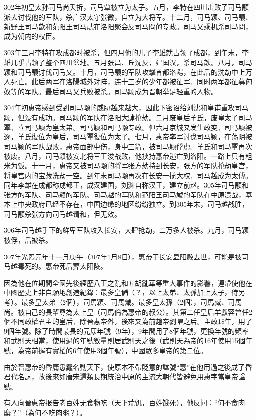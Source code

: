 302年初皇太孙司马尚夭折，司马覃被立为太子。五月，李特在四川击败了司马颙派去讨伐他的军队，杀广汉太守张微，自立为大将军。十二月，司马颖、司马颙、新野王司马歆和范阳王司马虓在洛阳聚会反司马冏的专政。司马乂乘机杀司马冏，成为朝内的权臣。

303年三月李特在攻成都时被杀，但四月他的儿子李雄就占领了成都，到年末，李雄几乎占领了整个四川盆地。五月张昌、丘沈反，建国汉，杀司马歆。八月，司马颖和司马颙讨伐司马乂。十月，司马颙的军队攻擊首都洛陽，在此后的洗劫中上万人死亡。此后两军在洛陽城外对阵，连十三岁的少年都被征军，同时两军都征募匈奴等的军队。最后司马乂兵败被杀。司马颙成为晋朝举足轻重的人物。

304年初惠帝感到受到司马颙的威胁越来越大，因此下密诏给刘沈和皇甫重攻司马颙，但没有成功。司马颙的军队在洛阳大肆抢劫。二月废皇后羊氏，废皇太子司马覃，立司马颖为皇太弟。司马颖和司马颙专政。但六月京城又发生政变，司马颖被逐，羊氏復位为皇后，司马覃復位为太子。七月，惠帝率军讨伐司马颖，在荡阴被司马颖的军队战败，惠帝面部中伤，身中三箭，被司马颖俘虏。羊氏和司马覃再次被废。八月，司马颖被安北将军王浚战败，他挟持惠帝逃亡到洛阳。一路上只有粗米为饭。十一月，惠帝又被司马颙的将军张方劫持到长安，张方的军队抢劫皇宫，将皇宫内的宝藏洗劫一空。到年末司马颙再次在长安一揽大权，司马越成为太傅。同年李雄在成都称成都王，成汉建国，刘渊自称汉王，建立前赵。305年司马颙和张方的军队、司马颖的军队、司马越的军队和范阳王司马虓的军队在中原混战，基本上中央政府已经不存在，中国边缘的地区纷纷独立。到305年末，司马越战胜，司马颙杀张方向司马越请和，但无效。

306年司马越手下的鲜卑军队攻入长安，大肆抢劫，二万多人被杀。九月，司马颖被俘，后被杀。

307年光熙元年十一月庚午（307年1月8日），惠帝于长安显阳殿去世，可能是被司马越毒死的。惠帝死后葬太阳陵。

因為他在位期間全國先後經歷八王之亂和五胡亂華等重大事件的影響，連帶使他在中國歷史上非自願地創造紀錄：最多皇儲（？，以上太弟、太孫加上太子，待另考）。最多皇太弟（2個），司馬穎、司馬熾。最多皇太孫（2個），司馬臧、司馬尚。被自己的長輩尊為太上皇（司馬倫為惠帝的叔公）。其第二任皇后羊獻容曾任2個不同政權君主的皇后，除晉惠帝外，後來又為前趙帝劉曜之后。主政18年，用了9個年號。除了時間最長的元康年號（9年），9年間用了8個年號，更換年號的頻率和武則天相當，使用過的年號數量則居武則天之後（武則天為帝的16年使用15個年號，為帝前握有實權的6年使用3個年號），中國眾多皇帝的第二位。

由於晉惠帝的昏庸愚蠢名動天下，使原本不帶貶意的諡號“惠”在他用過之後成了昏君代名詞，故後來如唐宋這類長期統治中原的主流大朝代皆避免用惠字當皇帝諡號。

有人向晉惠帝报告老百姓无食物吃（天下荒饥，百姓饿死），他反问：“何不食肉糜？”（為何不吃肉粥？）。

